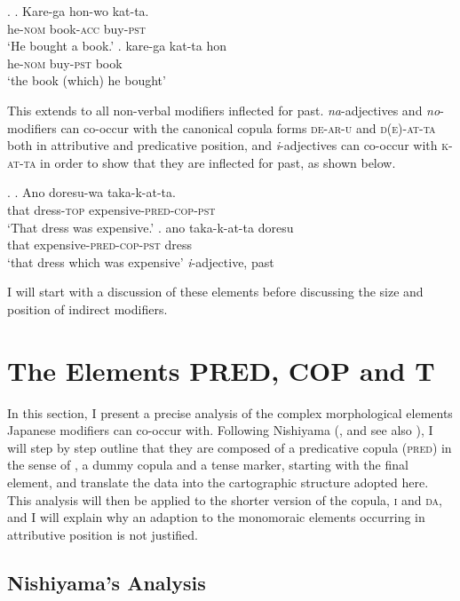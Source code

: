 \documentclass [output=book,colorlinks,citecolor=brown]{langscibook}
\begin{document}
\newpage

\ex. \ag. Kare-ga hon-wo kat-ta.\\
he-\textsc{nom} book-\textsc{acc} buy-\textsc{pst}\\
`He bought a book.’
\bg. kare-ga kat-ta hon\\
he-\textsc{nom} buy-\textsc{pst} book\\
`the book (which) he bought'

This extends to all non-verbal modifiers inflected for past. \textit{na}-adjectives and \textit{no}-modifiers can co-occur with the canonical copula forms \textsc{de-ar-u} and \textsc{d(e)-at-ta} both in attributive and predicative position, and \textit{i}-adjectives can co-occur with \textsc{k-at-ta} in order to show that they are inflected for past, as shown below.

\ex. \ag. Ano doresu-wa taka-k-at-ta.\\
that dress-\textsc{top} expensive-\textsc{pred-cop-pst}\\
`That dress was expensive.'
\bg. ano taka-k-at-ta doresu\\
that expensive-\textsc{pred-cop-pst} dress\\
`that dress which was expensive' \null \hfill \textit{i}-adjective, past

I will start with a discussion of these elements before discussing the size and position of indirect modifiers.

\section{The Elements PRED, COP and T} \label{copulaelements}

In this section, I present a precise analysis of the complex morphological elements Japanese modifiers can co-occur with. Following Nishiyama (\citealt{nishiyama:1999:adj}, and see also \citealt{miyama:2011:da, watanabe:2013:non, yamada:2023:looking}), I will step by step outline that they are composed of a predicative copula (\textsc{pred}) in the sense of \citet{bowers:1993:predication}, a dummy copula and a tense marker, starting with the final element, and translate the data into the cartographic structure adopted here. This analysis will then be applied to the shorter version of the copula, \textsc{i} and \textsc{da}, and I will explain why an adaption to the monomoraic elements occurring in attributive position is not justified. %

\subsection{Nishiyama's Analysis}
\end{document}
